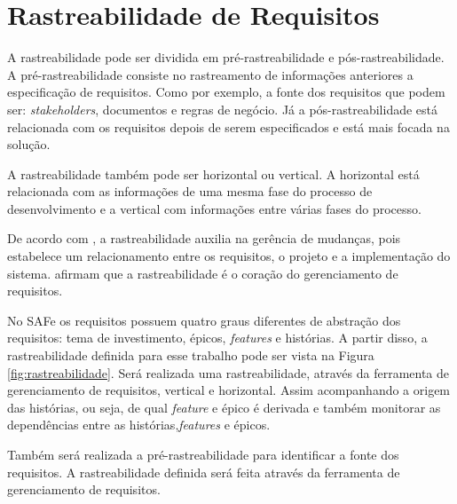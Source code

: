 \section[Rastreabilidade de Requisitos]{Rastreabilidade de Requisitos}

A rastreabilidade pode ser dividida em pré-rastreabilidade e pós-rastreabilidade. 
A pré-rastreabilidade consiste no rastreamento de informações anteriores a especificação
de requisitos. Como por exemplo, a fonte dos requisitos que podem ser: \textit{stakeholders},
documentos e regras de negócio. Já a pós-rastreabilidade está relacionada com os requisitos depois 
de serem especificados e está mais focada na solução. \cite{persson}

A rastreabilidade também pode ser horizontal ou vertical. A horizontal está relacionada com
as informações de uma mesma fase do processo de desenvolvimento e a vertical
com informações entre várias fases do processo. \cite{persson}

De acordo com , a rastreabilidade auxilia na gerência de mudanças, 
pois estabelece um relacionamento entre os requisitos, o projeto e a implementação do sistema. 
afirmam que a rastreabilidade é o coração do gerenciamento de requisitos.

No SAFe os requisitos possuem quatro graus diferentes de abstração dos requisitos: tema de investimento, épicos, \textit{features} e histórias.
A partir disso, a rastreabilidade definida para esse trabalho pode ser vista na Figura \ref{fig:rastreabilidade}.
Será realizada uma rastreabilidade, através da ferramenta de gerenciamento de requisitos, vertical e horizontal. Assim acompanhando
a origem das histórias, ou seja, de qual \textit{feature} e épico é derivada e também monitorar as dependências entre as histórias,\textit{features} e épicos.

Também será realizada a pré-rastreabilidade para identificar a fonte dos requisitos. A rastreabilidade definida será feita através da ferramenta de gerenciamento de requisitos.

\graphicspath{{figuras/}}

